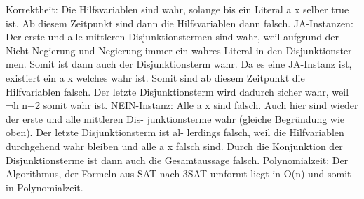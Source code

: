 \documentclass{lehramt-informatik-aufgabe}
\begin{document}
\begin{enumerate}
\begin{liAntwort}
Korrektheit: Die Hilfsvariablen sind wahr, solange bis ein Literal a x
selber true ist. Ab diesem Zeitpunkt sind dann die Hilfsvariablen dann
falsch. JA-Instanzen: Der erste und alle mittleren Disjunktionstermen
sind wahr, weil aufgrund der Nicht-Negierung und Negierung immer ein
wahres Literal in den Disjunktionster- men. Somit ist dann auch der
Disjunktionsterm wahr. Da es eine JA-Instanz ist, existiert ein a x
welches wahr ist. Somit sind ab diesem Zeitpunkt die Hilfvariablen
falsch. Der letzte Disjunktionsterm wird dadurch sicher wahr, weil ¬h
n−2 somit wahr ist. NEIN-Instanz: Alle a x sind falsch. Auch hier sind
wieder der erste und alle mittleren Dis- junktionsterme wahr (gleiche
Begründung wie oben). Der letzte Disjunktionsterm ist al- lerdings
falsch, weil die Hilfvariablen durchgehend wahr bleiben und alle a x
falsch sind. Durch die Konjunktion der Disjunktionsterme ist dann auch
die Gesamtaussage falsch. Polynomialzeit: Der Algorithmus, der Formeln
aus SAT nach 3SAT umformt liegt in O(n) und somit in Polynomialzeit.
\end{liAntwort}
\end{enumerate}
\end{document}
